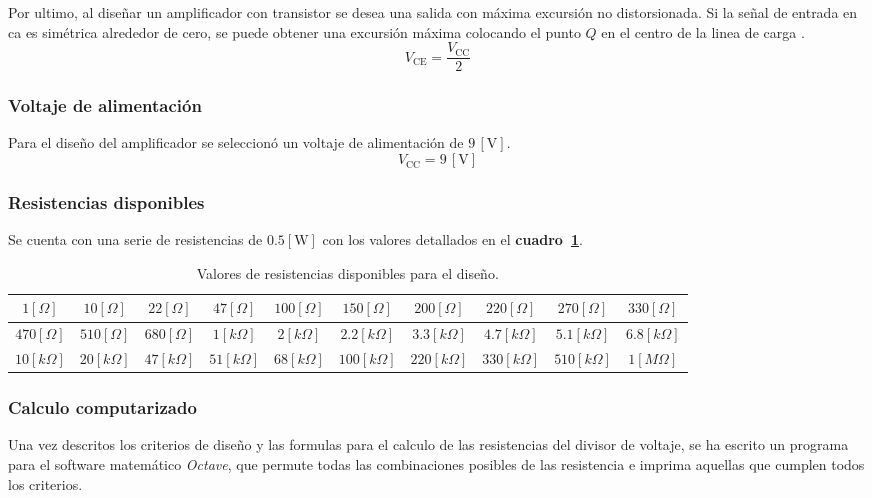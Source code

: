 Por ultimo, al diseñar un amplificador con transistor se desea una salida con
máxima excursión no distorsionada. Si la señal de entrada en ca es simétrica
alrededor de cero, se puede obtener una excursión máxima colocando el punto $Q$
en el centro de la linea de carga \cite{Savant}.
\begin{equation*}
    V_{\text{CE}} = \frac{V_{\text{CC}}}{2}
\end{equation*}

\subsubsection{Voltaje de alimentación}
Para el diseño del amplificador se seleccionó un voltaje de alimentación de
$9\,[\text{V}]$.
\begin{equation*}
    V_{\text{CC}} = 9\,[\text{V}]
\end{equation*}

\subsubsection{Resistencias disponibles}
Se cuenta con una serie de resistencias de $0.5[\text{W}]$ con los valores
detallados en el \textbf{cuadro~\ref{cuadro06}}.

\begin{table}[!ht]
\begin{center}
    \begin{tabular}{|c|c|c|c|c|c|c|c|c|c|}
    \hline
    $1[\Omega]$ & $10[\Omega]$ & $22[\Omega]$ & $47[\Omega]$ & $100[\Omega]$ &
    $150[\Omega]$ & $200[\Omega]$ & $220[\Omega]$ & $270[\Omega]$ &
    $330[\Omega]$
    \tabularnewline \hline
    $470[\Omega]$ & $510[\Omega]$ & $680[\Omega]$ & $1[k{\Omega}]$ &
    $2[k{\Omega}]$ & $2.2[k{\Omega}]$ & $3.3[k{\Omega}]$ & $4.7[k{\Omega}]$ &
    $5.1[k{\Omega}]$ & $6.8[k{\Omega}]$
    \tabularnewline \hline
    $10[k{\Omega}]$ & $20[k{\Omega}]$ & $47[k{\Omega}]$ & $51[k{\Omega}]$ &
    $68[k{\Omega}]$ & $100[k{\Omega}]$ & $220[k{\Omega}]$ & $330[k{\Omega}]$ &
    $510[k{\Omega}]$ & $1[M{\Omega}]$
    \tabularnewline \hline
    \end{tabular}
\end{center}
\caption{Valores de resistencias disponibles para el diseño.}
\label{cuadro06}
\end{table}

\subsubsection{Calculo computarizado}
Una vez descritos los criterios de diseño y las formulas para el calculo de las
resistencias del divisor de voltaje, se ha escrito un programa para el software
matemático \emph{Octave}, que permute todas las combinaciones posibles de las 
resistencia e imprima aquellas que cumplen todos los criterios.

